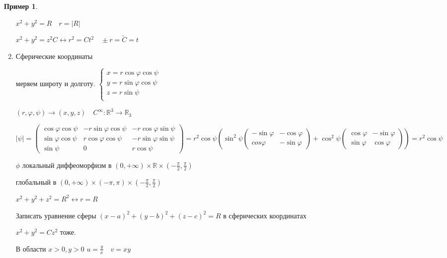\documentclass{book}
\newcommand\R{\ensuremath{\mathbb{R}}}
\newcommand{\tl}[1]{\widetilde{#1}}
\theoremstyle{definition}
\newtheorem*{example}{Пример}
\begin{document}
\begin{example}
\begin{enumerate}
                    $x^2+y^2=R\quad r=|R|$

                     $x^2+y^2=z^2C \leftrightarrow r^2 = Ct^2\quad \pm r = \tl C = t$
                \item Сферические координаты

                    меряем широту и долготу. $\begin{cases}
                        x=r\cos \varphi\cos \psi\\
                        y=r\sin \varphi \cos \psi\\
                        z=r\sin \psi\\
                    \end{cases}$ 

                    $(r, \varphi, \psi) \to \left( x,y, z \right) \quad C^{\infty }:\R^3 \to  \R_3$

                    $\left| \psi \right| = \begin{pmatrix} \cos \varphi\cos \psi&-r\sin \varphi\cos \psi&-r\cos \varphi\sin \psi\\ \sin \varphi\cos \psi & r\cos \varphi\cos \psi & -r\sin \varphi\sin \psi\\ \sin \psi & 0 & r\cos \psi \end{pmatrix}  = r^2\cos \psi\left( \sin ^2\psi \begin{pmatrix} -\sin \varphi & -\cos \varphi\\cos\varphi&-\sin \varphi \end{pmatrix}  + \cos ^2\psi \begin{pmatrix} \cos \varphi & -\sin \varphi\\ \sin \varphi&\cos \varphi \end{pmatrix}  \right)  = r^2\cos \psi $

                    $\phi$ локальный диффеоморфизм в  $\left( 0, +\infty  \right) \times \R\times \left( -\frac{\pi}{2}, \frac{\pi}{2}   \right) $ 

                    глобальный в $\left( 0, +\infty \right) \times \left( -\pi , \pi  \right) \times \left( -\frac{\pi}{2}, \frac{\pi}{2}   \right)  $ 

                    $x^2+y^2+z^2=R^2 \leftrightarrow r=R$

                    \begin{problem}
                        Записать уравнение сферы $(x-a)^2 + (y-b)^2 + (z-c)^2 = R$ в сферических координатах

                        $x^2+y^2 = Cz^2$ тоже.
                    \end{problem}
                    \begin{problem}
                        В области $x>0, y>0$  $u = \frac{y}{x}\quad v = xy$


\end{problem}
\end{enumerate}
\end{example}
\end{document}
